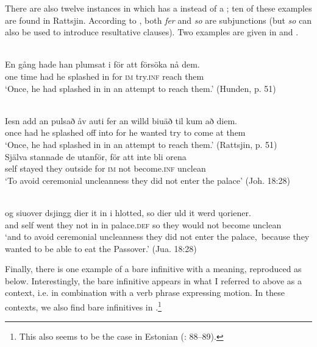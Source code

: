 \documentclass[output=paper]{langscibook}
\begin{document}
There are also twelve instances in which  has a  instead of a ; ten of these examples are found in Rattsjin. According to \citet[491]{AkerbergNystrom2012}, both \textit{fer} and \textit{so} are  subjunctions (but \textit{so} can also be used to introduce resultative clauses). Two examples are given in  and .  

\ea
\label{ex:kalm:20}
\ea {}\label{ex:kalm:20a}\\
\gll En gång hade han plumsat i för att försöka nå dem.\\
one time had he splashed in for \textsc{im} try.\textsc{inf} reach them\\ 
\glt ‘Once, he had splashed in in an attempt to reach them.’ (Hunden, p. 51)

\ex {}\label{ex:kalm:20b}\\
\gll Iesn add an pulsað åv auti fer an willd biuäð til kum að diem.\\
once had he splashed off into for he wanted try to come at them\\
\glt ‘Once, he had splashed in in an attempt to reach them.’ (Rattsjin, p. 51)
\z 
\ex
\label{ex:kalm:21}
\ea {}\label{ex:kalm:21a}\\ 
\gll Själva stannade de utanför, för att inte bli orena\\
self stayed they outside for \textsc{im} not become.\textsc{inf} unclean\\
\glt ‘To avoid ceremonial uncleanness they did not enter the palace’ (Joh. 18:28)

\ex {}\label{ex:kalm:21b}\\
\gll og siuover dsjingg dier it in i hlotted, so dier uld it werd \k{u}oriener.\\
and self went they not in in palace.\textsc{def} so they would not become unclean\\
\glt ‘and to avoid ceremonial uncleanness they did not enter the palace,{~}because they wanted to be able to eat the Passover.’ (Jua. 18:28)
\z 
\z\largerpage[2]


Finally, there is one example of a bare infinitive with a  meaning, reproduced as  below. Interestingly, the bare infinitive appears in what I referred to above as a  context, i.e. in combination with a verb phrase expressing motion. In these contexts, we also find bare infinitives in .\footnote{This also seems to be the case in Estonian  (\citealt{Lagman1958}: 88–89).} 
\end{document}
